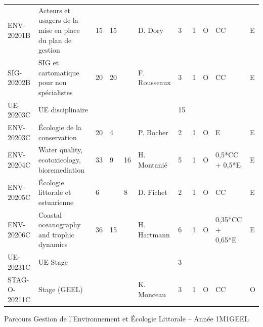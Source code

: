\documentclass[a4paper,11pt]{article}
\begin{document}
{{\begin{tabular}{lllllllllll}
ENV-20201B                         & Acteurs et usagers de la mise en place du plan de gestion                      & 15 & 15                         &    & D. Dory                            & 3    & 1    & O           & CC               & E         \\
SIG-20202B                         & SIG et cartomatique pour non spécialistes                                      & 20 & \cellcolor[HTML]{FD6864}20 &    & F. Rousseaux                       & 3    & 1    & O           & CC               & E         \\
\rowcolor[HTML]{EFEFEF} 
UE-20203C                          & UE disciplinaire                                                               &    &                            &    &                                    & 15   &      &             &                  &           \\
ENV-20203C                         & Écologie de la conservation                                                    & 20 & 4                          &    & P. Bocher                          & 2    & 1    & O           & E                & E         \\
ENV-20204C                         & Water quality, ecotoxicology, bioremediation                                   & 33 & 9                          & 16 & H. Montanié                        & 5    & 1    & O           & 0,5*CC + 0,5*E   & E         \\
ENV-20205C                         & Écologie littorale et estuarienne                                              & 6  &                            & 8  & D. Fichet                          & 2    & 1    & O           & CC               & E         \\
ENV-20206C                         & \cellcolor[HTML]{FD6864}Coastal oceanography and trophic dynamics              & 36 & 15                         &    & H. Hartmann                        & 6    & 1    & O           & 0,35*CC + 0,65*E & E         \\
\rowcolor[HTML]{EFEFEF} 
UE-20231C                          & UE Stage                                                                       &    &                            &    &                                    & 3    &      &             &                  &           \\
STAG-O-20211C                      & Stage (GEEL)                                                                   &    &                            &    & \cellcolor[HTML]{FD6864}K. Monceau & 3    & 1    & O           & CC               & O        
\end{tabular}}
}{Parcours Gestion de l'Environnement et Écologie Littorale -- Année 1}{M1GEEL}
\end{document}
